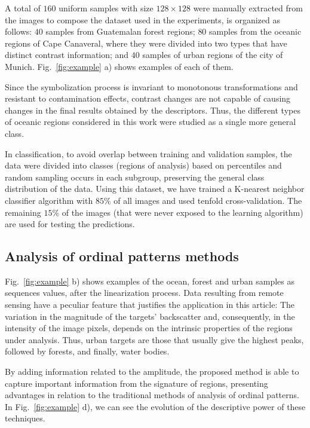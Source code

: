 \documentclass[journal]{IEEEtran}
\begin{document}
A total of $160$ uniform samples with size $128 \times 128$ were manually extracted from the images to compose the dataset used in the experiments, is organized as follows:
$40$ samples from Guatemalan forest regions;
$80$ samples from the oceanic regions of Cape Canaveral, where they were divided into two types that have distinct contrast information; and
$40$ samples of urban regions of the city of Munich.
Fig.~\ref{fig:example} a) shows examples of each of them.

Since the symbolization process is invariant to monotonous transformations and resistant to contamination effects, contrast changes are not capable of causing changes in the final results obtained by the descriptors.
Thus, the different types of oceanic regions considered in this work were studied as a single more general class.

In classification, to avoid overlap between training and validation samples, the data were divided into classes (regions of analysis) based on percentiles and random sampling occurs in each subgroup, preserving the general class distribution of the data.
Using this dataset, we have trained a K-nearest neighbor classifier algorithm with $85\%$ of all images and used tenfold cross-validation. 
The remaining $15\%$ of the images (that were never exposed to the learning algorithm) are used for testing the predictions.

\subsection{Analysis of ordinal patterns methods}

Fig.~\ref{fig:example} b) shows examples of the ocean, forest and urban samples as sequences values, after the linearization process.
Data resulting from remote sensing have a peculiar feature that justifies the application in this article:
The variation in the magnitude of the targets' backscatter and, consequently, in the intensity of the image pixels, depends on the intrinsic properties of the regions under analysis.
Thus, urban targets are those that usually give the highest peaks, followed by forests, and finally, water bodies.

By adding information related to the amplitude, the proposed method is able to capture important information from the signature of regions, presenting advantages in relation to the traditional methods of analysis of ordinal patterns.
In Fig.~\ref{fig:example} d), we can see the evolution of the descriptive power of these techniques.
\end{document}
